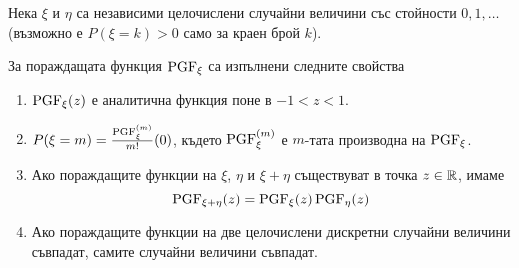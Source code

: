 \documentclass[numbers=endperiod, DIV=15, bibliography=totocnumbered]{scrartcl}
\begin{document}
\begin{theorem}
  Нека $\xi$ и $\eta$ са независими целочислени случайни величини със стойности $0, 1, \ldots$ (възможно е $P(\xi = k) > 0$ само за краен брой $k$).

  За пораждащата функция $\operatorname{PGF}_\xi$ са изпълнени следните свойства
  \begin{enumerate}
    \item $\operatorname{PGF}_\xi(z)$ е аналитична функция поне в $-1 < z < 1$.
    \item $P(\xi = m) = \frac {\operatorname{PGF}_\xi^{(m)}} {m!} (0)$, където $\operatorname{PGF}_\xi^{(m)}$ е $m$-тата производна на $\operatorname{PGF}_\xi$.
    \item Ако пораждащите функции на $\xi$, $\eta$ и $\xi + \eta$ съществуват в точка $z \in \mathbb{R}$, имаме
    \begin{displaymath}
      \operatorname{PGF}_{\xi + \eta}(z) = \operatorname{PGF}_\xi(z) \operatorname{PGF}_\eta(z)
    \end{displaymath}

    \item Ако пораждащите функции на две целочислени дискретни случайни величини съвпадат, самите случайни величини съвпадат.
  \end{enumerate}
\end{theorem}
\end{document}
